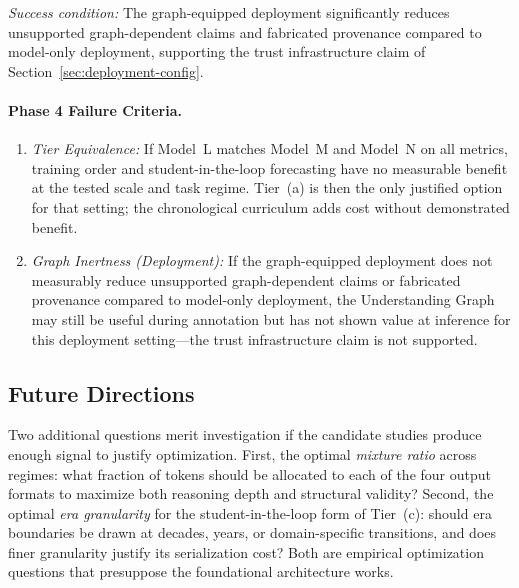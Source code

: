 \emph{Success condition:} The graph-equipped deployment significantly reduces unsupported graph-dependent claims and fabricated provenance compared to model-only deployment, supporting the trust infrastructure claim of Section~\ref{sec:deployment-config}.

\paragraph{Phase 4 Failure Criteria.}
\begin{enumerate}
    \item \emph{Tier Equivalence:} If Model~L matches Model~M and Model~N on all metrics, training order and student-in-the-loop forecasting have no measurable benefit at the tested scale and task regime. Tier~(a) is then the only justified option for that setting; the chronological curriculum adds cost without demonstrated benefit.
    \item \emph{Graph Inertness (Deployment):} If the graph-equipped deployment does not measurably reduce unsupported graph-dependent claims or fabricated provenance compared to model-only deployment, the Understanding Graph may still be useful during annotation but has not shown value at inference for this deployment setting---the trust infrastructure claim is not supported.
\end{enumerate}


\subsection{Future Directions}

Two additional questions merit investigation if the candidate studies produce enough signal to justify optimization. First, the optimal \emph{mixture ratio} across regimes: what fraction of tokens should be allocated to each of the four output formats to maximize both reasoning depth and structural validity? Second, the optimal \emph{era granularity} for the student-in-the-loop form of Tier~(c): should era boundaries be drawn at decades, years, or domain-specific transitions, and does finer granularity justify its serialization cost? Both are empirical optimization questions that presuppose the foundational architecture works.

